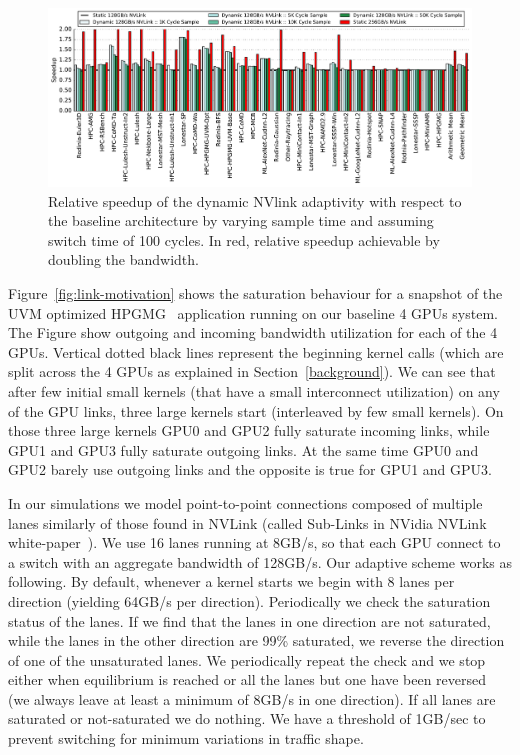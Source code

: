 \begin{figure}[tp]
    \centering
    \includegraphics[width=1.0\textwidth]{figures/plot_nvlink_sample_time.pdf}
    \caption{Relative speedup of the dynamic NVlink adaptivity with respect to
	the baseline architecture by varying sample time and assuming switch time of
	100 cycles. In red, relative speedup achievable by doubling the bandwidth.}
    \label{fig:sampletime}
\end{figure}

Figure~\ref{fig:link-motivation} shows the saturation behaviour for a 
snapshot of the UVM optimized 
HPGMG~\cite{adams2014hpgmg} application running on our baseline 4 GPUs system. The Figure 
show outgoing and incoming bandwidth utilization for each of the 4 GPUs. 
Vertical dotted black lines represent the beginning kernel calls (which are 
split across the 4 GPUs as explained in Section~\ref{background}). We can see 
that after few initial small kernels (that have a small interconnect 
utilization) on any of the GPU links, three large kernels start (interleaved 
by few small kernels). On those three large kernels GPU0 and GPU2 fully 
saturate incoming links, while GPU1 and GPU3 fully saturate outgoing links. 
At the same time GPU0 and GPU2 barely use outgoing links and the opposite is 
true for GPU1 and GPU3.

In our simulations we model point-to-point connections composed of multiple 
lanes similarly of those found in NVLink (called Sub-Links in NVidia NVLink 
white-paper~\cite{pascal-tesla-wp}). We use 16 lanes running at 8GB/s, so 
that each GPU connect to a switch with an aggregate bandwidth of 128GB/s. 
Our adaptive scheme works as following. By default, whenever a kernel starts 
we begin with 8 lanes per direction (yielding 64GB/s per direction). 
Periodically we check the saturation status of the lanes. If we find that 
the lanes in one direction are not saturated, while the lanes in the other 
direction are 99\% saturated, we reverse the direction of one of the 
unsaturated lanes. We periodically repeat the check and we stop either when 
equilibrium is reached or all the lanes but one have been reversed (we always 
leave at least a minimum of 8GB/s in one direction). If all 
lanes are saturated or not-saturated we do nothing. We have a threshold of 
1GB/sec to prevent switching for minimum variations in traffic shape.

